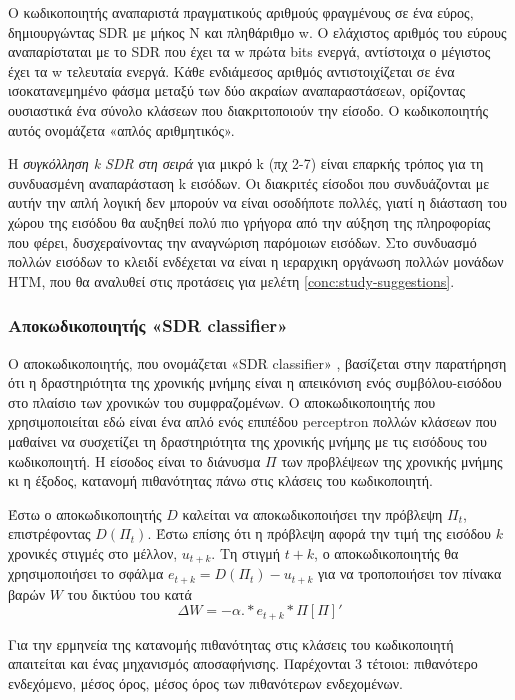 	Ο κωδικοποιητής αναπαριστά πραγματικούς αριθμούς φραγμένους σε ένα εύρος, δημιουργώντας SDR με μήκος N και πληθάριθμο w.
	Ο ελάχιστος αριθμός του εύρους αναπαρίσταται με το SDR που έχει τα w πρώτα bits ενεργά, αντίστοιχα ο μέγιστος έχει τα w τελευταία ενεργά.
	Κάθε ενδιάμεσος αριθμός αντιστοιχίζεται σε ένα ισοκατανεμημένο φάσμα μεταξύ των δύο ακραίων αναπαραστάσεων,
	ορίζοντας ουσιαστικά ένα σύνολο κλάσεων που διακριτοποιούν την είσοδο.
	Ο κωδικοποιητής αυτός ονομάζετα «απλός αριθμητικός».

	Η \textit{συγκόλληση k SDR στη σειρά} για μικρό k (πχ 2-7) είναι επαρκής τρόπος για τη συνδυασμένη αναπαράσταση k εισόδων.
	Οι διακριτές είσοδοι που συνδυάζονται με αυτήν την απλή λογική δεν μπορούν να είναι οσοδήποτε πολλές,
	γιατί η διάσταση του χώρου της εισόδου θα αυξηθεί πολύ πιο γρήγορα από την αύξηση της πληροφορίας που φέρει,
	δυσχεραίνοντας την αναγνώριση παρόμοιων εισόδων.
	Στο συνδυασμό πολλών εισόδων το κλειδί ενδέχεται να είναι η ιεραρχικη οργάνωση πολλών μονάδων HTM,
	που θα αναλυθεί στις προτάσεις για μελέτη \ref{conc:study-suggestions}.

	\subsubsection{Αποκωδικοποιητής «SDR classifier»}

	Ο αποκωδικοποιητής, που ονομάζεται «SDR classifier» \parencite{cuiContinuousOnlineSequence2016},
	βασίζεται στην παρατήρηση ότι η δραστηριότητα της χρονικής μνήμης είναι η απεικόνιση ενός συμβόλου-εισόδου στο πλαίσιο των χρονικών του συμφραζομένων.
	Ο αποκωδικοποιητής που χρησιμοποιείται εδώ είναι ένα απλό ενός επιπέδου perceptron πολλών κλάσεων που μαθαίνει να συσχετίζει
	τη δραστηριότητα της χρονικής μνήμης με τις εισόδους του κωδικοποιητή.
	Η είσοδος είναι το διάνυσμα $Π$ των προβλέψεων της χρονικής μνήμης κι η έξοδος, κατανομή πιθανότητας πάνω στις κλάσεις του κωδικοποιητή.

	Έστω ο αποκωδικοποιητής $D$ καλείται να αποκωδικοποιήσει την πρόβλεψη $Π_t$, επιστρέφοντας
	$D(Π_t)$.
	Έστω επίσης ότι η πρόβλεψη αφορά την τιμή της εισόδου $k$ χρονικές στιγμές στο μέλλον,
	$u_{t+k}$.
	Τη στιγμή $t+k$, ο αποκωδικοποιητής θα χρησιμοποιήσει το σφάλμα $e_{t+k} = D(Π_t) - u_{t+k}$
	για να τροποποιήσει τον πίνακα βαρών $W$ του δικτύου του κατά
	$$ ΔW= -α .* e_{t+k}*Π[Π]' $$

	Για την ερμηνεία της κατανομής πιθανότητας στις κλάσεις του κωδικοποιητή απαιτείται και ένας μηχανισμός αποσαφήνισης.
	Παρέχονται 3 τέτοιοι: πιθανότερο ενδεχόμενο, μέσος όρος, μέσος όρος των πιθανότερων ενδεχομένων.


